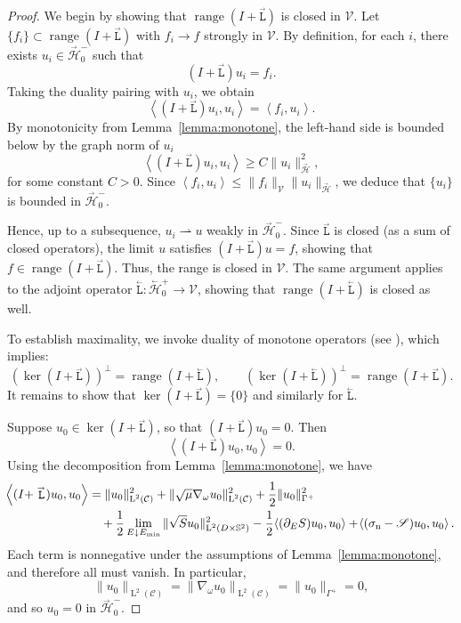 \documentclass{amsart}
\newcommand{\fL}{\stackrel{_\rightarrow}{\mathtt L}}
\newcommand{\bL}{\stackrel{_\leftarrow}{\mathtt L}}
\theoremstyle{plain}
\newcommand{\leb}{\text{Leb}}
\newcommand{\LL}{\ensuremath{\operatorname L}\xspace}
\renewcommand{\leb}[1]{\ensuremath{\LL^{#1}}}
\newcommand{\ltwop}[2]{\ensuremath{\!\left\langle{#1,#2}\right\rangle}}
\newcommand{\cH}{\stackrel{_\rightarrow}{\mathscr H}}
\newcommand{\cbH}{\stackrel{_\leftarrow}{\mathscr H}}
\newcommand{\cS}{\ensuremath{\mathscr S}}
\newcommand{\cV}{\ensuremath{\mathscr V}}
\begin{document}
\begin{proof}
We begin by showing that $\operatorname{range}(I + \fL)$ is closed in
$\cV$. Let $\{f_i\} \subset \operatorname{range}(I + \fL)$ with $f_i
\to f$ strongly in $\cV$. By definition, for each $i$, there exists
$u_i \in \cH_0^-$ such that
\begin{equation}
  (I + \fL) u_i = f_i.
\end{equation}
Taking the duality pairing with $u_i$, we obtain
\begin{equation}
  \ltwop{(I + \fL) u_i}{u_i} = \ltwop{f_i}{u_i}.
\end{equation}
By monotonicity from Lemma~\ref{lemma:monotone}, the left-hand side is
bounded below by the graph norm of $u_i$
\begin{equation}
  \ltwop{(I + \fL) u_i}{u_i} \geq C \|u_i\|_{\cH}^2,
\end{equation}
for some constant $C > 0$. Since $\ltwop{f_i}{u_i} \leq \|f_i\|_{\cV}
\|u_i\|_{\cH}$, we deduce that $\{u_i\}$ is bounded in $\cH_0^-$.

Hence, up to a subsequence, $u_i \rightharpoonup u$ weakly in
$\cH_0^-$. Since $\fL$ is closed (as a sum of closed operators), the
limit $u$ satisfies $(I + \fL) u = f$, showing that $f \in
\operatorname{range}(I + \fL)$. Thus, the range is closed in
$\cV$. The same argument applies to the adjoint operator $\bL :
\cbH_0^+ \to \cV$, showing that $\operatorname{range}(I + \bL)$ is
closed as well.

To establish maximality, we invoke duality of monotone operators (see
\cite[Thm.~7.1]{brezis2011functional}), which implies:
\begin{equation}
  \left( \operatorname{ker}(I + \fL) \right)^\perp = \operatorname{range}(I + \bL), 
  \qquad 
  \left( \operatorname{ker}(I + \bL) \right)^\perp = \operatorname{range}(I + \fL).
\end{equation}
It remains to show that $\operatorname{ker}(I + \fL) = \{0\}$ and similarly for $\bL$.

Suppose $u_0 \in \operatorname{ker}(I + \fL)$, so that $(I + \fL) u_0 = 0$. Then
\begin{equation}
  \ltwop{(I + \fL) u_0}{u_0} = 0.
\end{equation}
Using the decomposition from Lemma~\ref{lemma:monotone}, we have
\begin{align}
  \ltwop{(I + \fL) u_0}{u_0}
  &= \|u_0\|^2_{\leb2(\mathcal{C})}
  + \|\sqrt{\mu} \nabla_\omega u_0\|^2_{\leb2(\mathcal{C})}
  + \frac{1}{2} \|u_0\|^2_{\Gamma^+} \notag\\
  &\quad + \frac{1}{2} \lim_{E \downarrow E_{\min}} \|\sqrt{S} u_0\|^2_{\leb2(D \times \mathbb{S}^2)}
  - \frac{1}{2} \ltwop{(\partial_E S) u_0}{u_0}
  + \ltwop{(\sigma_{\mathrm{n}} - \cS) u_0}{u_0}.
\end{align}
Each term is nonnegative under the assumptions of
Lemma~\ref{lemma:monotone}, and therefore all must vanish. In
particular,
\begin{equation}
  \|u_0\|_{\leb2(\mathcal{C})} = \|\nabla_\omega u_0\|_{\leb2(\mathcal{C})} = \|u_0\|_{\Gamma^+} = 0,
\end{equation}
and so $u_0 = 0$ in $\cH_0^-$.


\end{proof}
\end{document}
